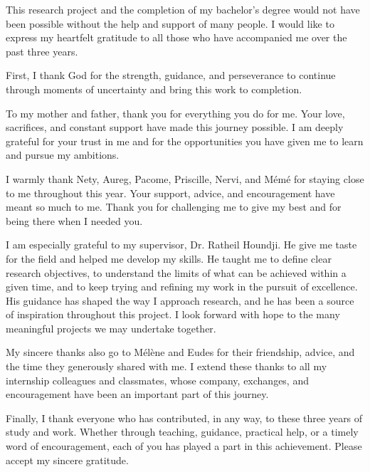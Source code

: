 \remerciements

This research project and the completion of my bachelor's degree would not
have been possible without the help and support of many people. I would like
to express my heartfelt gratitude to all those who have accompanied me over
the past three years.

First, I thank God for the strength, guidance, and perseverance to continue
through moments of uncertainty and bring this work to completion.

To my mother and father, thank you for everything you do for me. Your love,
sacrifices, and constant support have made this journey possible. I am deeply
grateful for your trust in me and for the opportunities you have given me to
learn and pursue my ambitions.

I warmly thank Nety, Aureg, Pacome, Priscille, Nervi, and Mémé for staying close
to me throughout this year. Your support, advice, and encouragement have meant
so much to me. Thank you for challenging me to give my best and for being
there when I needed you.

I am especially grateful to my supervisor, Dr. Ratheil Houndji. He give me taste 
for the field and helped me develop my skills. He taught me
to define clear research objectives, to understand the limits of what can be
achieved within a given time, and to keep trying and refining my work in the
pursuit of excellence. His guidance has shaped the way I approach research,
and he has been a source of inspiration throughout this project. I look
forward with hope to the many meaningful projects we may undertake together.

My sincere thanks also go to Mélène and Eudes for their
friendship, advice, and the time they generously shared with me. I extend
these thanks to all my internship colleagues and classmates, whose company,
exchanges, and encouragement have been an important part of this journey.

Finally, I thank everyone who has contributed, in any way, to these three
years of study and work. Whether through teaching, guidance, practical help,
or a timely word of encouragement, each of you has played a part in this
achievement. Please accept my sincere gratitude.
